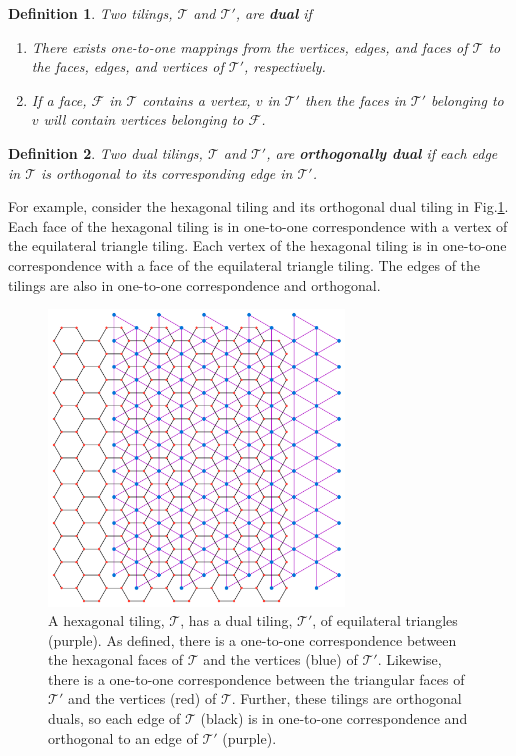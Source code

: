 \documentclass[
  oneside,
  11pt, a4paper,
  footinclude=true,
  headinclude=true,
  cleardoublepage=empty
]{scrbook}
\newtheorem{mydef}{Definition}
\begin{document}
\begin{mydef}
Two tilings, $\mathcal{T}$ and $\mathcal{T}'$, are \textbf{dual} if 
\begin{enumerate}
\item There exists one-to-one mappings from the vertices, edges, and faces of $\mathcal{T}$  to the faces, edges, and vertices of $\mathcal{T}'$, respectively.
\item If a face, $\mathcal{F}$ in $\mathcal{T}$ contains a vertex, $v$ in $\mathcal{T}'$ then the faces in $\mathcal{T}'$ belonging to $v$ will contain vertices belonging to $\mathcal{F}$. 
\end{enumerate}
\end{mydef}

\begin{mydef}
Two dual tilings, $\mathcal{T}$ and $\mathcal{T}'$, are \textbf{orthogonally dual} if each edge in $\mathcal{T}$ is orthogonal to its corresponding edge in $\mathcal{T}'$.
\end{mydef}

For example, consider the hexagonal tiling and its orthogonal dual tiling in Fig.\ref{fig:Hexagons}. Each face of the hexagonal tiling is in one-to-one correspondence with a vertex of the equilateral triangle tiling. Each vertex of the hexagonal tiling is in one-to-one correspondence with a face of the equilateral triangle tiling. The edges of the tilings are also in one-to-one correspondence and orthogonal. 

\begin{figure}[H]
\centering
\includegraphics[width=0.7\textwidth]{HexagonDuals}
\caption[Hexagonal Tiling Dual]{A hexagonal tiling, $\mathcal{T}$, has a dual tiling, $\mathcal{T}'$, of equilateral triangles (purple). As defined, there is a one-to-one correspondence between the hexagonal faces of $\mathcal{T}$ and the vertices (blue) of $\mathcal{T}'$. Likewise, there is a one-to-one correspondence between the triangular faces of $\mathcal{T}'$ and the vertices (red) of $\mathcal{T}$. Further, these tilings are orthogonal duals, so each edge of $\mathcal{T}$ (black) is in one-to-one correspondence and orthogonal to an edge of $\mathcal{T}'$ (purple).}
\label{fig:Hexagons}
\end{figure}
\end{document}
